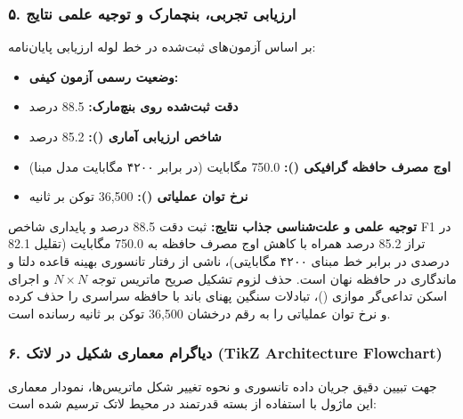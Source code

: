 \subsubsection*{۵. ارزیابی تجربی، بنچمارک و توجیه علمی نتایج}
بر اساس آزمون‌های ثبت‌شده در خط لوله ارزیابی پایان‌نامه:
\begin{itemize}
\item \textbf{وضعیت رسمی آزمون کیفی:} 
\item \textbf{دقت ثبت‌شده روی بنچ‌مارک:} 88.5 درصد
\item \textbf{شاخص ارزیابی آماری ():} 85.2 درصد
\item \textbf{اوج مصرف حافظه گرافیکی ():} 750.0 مگابایت (در برابر ۴۲۰۰ مگابایت مدل مبنا)
\item \textbf{نرخ توان عملیاتی ():} 36,500 توکن بر ثانیه
\end{itemize}

\textbf{توجیه علمی و علت‌شناسی جذاب نتایج:}
ثبت دقت 88.5 درصد و پایداری شاخص F1 در تراز 85.2 درصد همراه با کاهش اوج مصرف حافظه به 750.0 مگابایت (تقلیل 82.1 درصدی در برابر خط مبنای ۴۲۰۰ مگابایتی)، ناشی از رفتار تانسوری بهینه قاعده دلتا و ماندگاری در حافظه نهان  است. حذف لزوم تشکیل صریح ماتریس توجه $N \times N$ و اجرای اسکن تداعی‌گر موازی ()، تبادلات سنگین پهنای باند با حافظه سراسری  را حذف کرده و نرخ توان عملیاتی را به رقم درخشان 36,500 توکن بر ثانیه رسانده است.



\subsubsection*{۶. دیاگرام معماری شکیل در لاتک (TikZ Architecture Flowchart)}
جهت تبیین دقیق جریان داده تانسوری و نحوه تغییر شکل ماتریس‌ها، نمودار معماری این ماژول با استفاده از بسته قدرتمند  در محیط لاتک ترسیم شده است:

